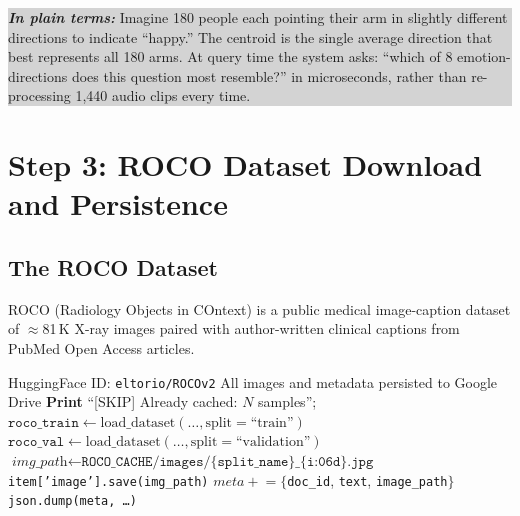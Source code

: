 \documentclass[12pt, a4paper]{article}
\theoremstyle{definition}
\theoremstyle{plain}
\theoremstyle{remark}
\newcommand{\layman}[1]{%
  \vspace{4pt}%
  \noindent\colorbox{lightgray}{\parbox{\dimexpr\linewidth-2\fboxsep}{%
    \textbf{\textit{In plain terms:}} #1}}%
  \vspace{4pt}%
}
\begin{document}
\layman{Imagine 180 people each pointing their arm in slightly different directions to indicate ``happy.'' The centroid is the single average direction that best represents all 180 arms. At query time the system asks: ``which of 8 emotion-directions does this question most resemble?'' in microseconds, rather than re-processing 1,440 audio clips every time.}

\section{Step 3: ROCO Dataset Download and Persistence}
\label{sec:roco}

\subsection{The ROCO Dataset}

ROCO (Radiology Objects in COntext) is a public medical image-caption dataset of $\approx$81\,K X-ray images paired with author-written clinical captions from PubMed Open Access articles.

\begin{algorithm}[H]
\caption{DOWNLOAD\_AND\_CACHE\_ROCO}
\label{alg:roco}
\begin{algorithmic}[1]
\Require HuggingFace ID: \texttt{eltorio/ROCOv2}
\Ensure All images and metadata persisted to Google Drive
  \State \textbf{Print} ``[SKIP] Already cached: $N$ samples''; \Return {}
\EndIf
\State $\texttt{roco\_train} \gets \text{load\_dataset}(\ldots, \text{split}=\text{``train''})$
\State $\texttt{roco\_val} \gets \text{load\_dataset}(\ldots, \text{split}=\text{``validation''})$
    \State $\textit{img\_path} \gets \texttt{ROCO\_CACHE/images/\{split\_name\}\_\{i:06d\}.jpg}$
      \State \texttt{item['image'].save(img\_path)} 
    \EndIf
    \State $\textit{meta} \mathrel{+}= \{$\texttt{doc\_id}, \texttt{text}, \texttt{image\_path}$\}$
  \EndFor
  \State \texttt{json.dump(meta, \ldots)}
\EndProcedure
\State {} 
\State {} 
\end{algorithmic}
\end{algorithm}
\end{document}
